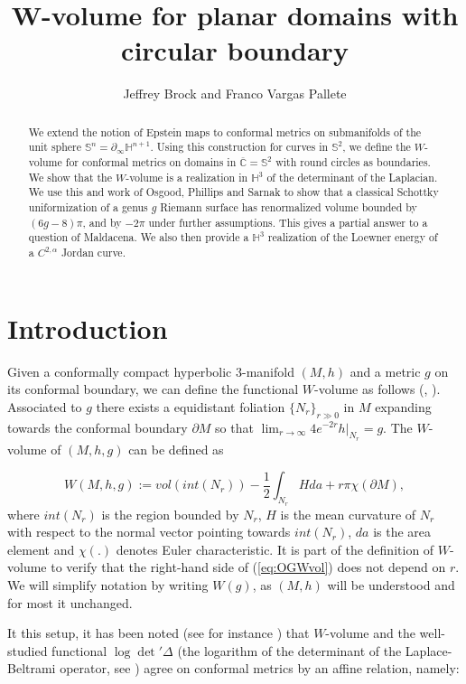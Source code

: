 \documentclass[12pt]{amsart}
\title{W-volume for planar domains with circular boundary}
\author{Jeffrey Brock and Franco Vargas Pallete}
\begin{document}
\maketitle

\begin{abstract}
    We extend the notion of Epstein maps to conformal metrics on submanifolds of the unit sphere $\mathbb{S}^n=\partial_\infty\mathbb{H}^{n+1}$. Using this construction for curves in $\mathbb{S}^2$, we define the $W$-volume for conformal metrics on domains in $\overline{\mathbb{C}}=\mathbb{S}^2$ with round circles as boundaries. We show that the $W$-volume is a realization in $\mathbb{H}^3$ of the determinant of the Laplacian. We use this and work of Osgood, Phillips and Sarnak to show that a classical Schottky uniformization of a genus $g$ Riemann surface has renormalized volume bounded by $(6g-8)\pi$, and by $-2\pi$ under further assumptions. This gives a partial answer to a question of Maldacena. We also then provide a $\mathbb{H}^3$ realization of the Loewner energy of a $C^{2,\alpha}$ Jordan curve.
\end{abstract}

\section{Introduction}

Given a conformally compact hyperbolic $3$-manifold $(M,h)$ and a metric $g$ on its conformal boundary, we can define the functional $W$-volume as follows (\cite{Graham}, \cite{KrasnovSchlenker08}). Associated to $g$ there exists a equidistant foliation $\lbrace N_r\rbrace_{r\gg0}$ in $M$ expanding towards the conformal boundary $\partial M$ so that $\lim_{r\rightarrow\infty} 4e^{-2r}h|_{N_r}=g$. The $W$-volume of $(M,h,g)$ can be defined as

\begin{equation}\label{eq:OGWvol}
    W(M,h,g) := vol(int(N_r)) - \frac12 \int_{N_r}Hda + r\pi\chi(\partial M),
\end{equation}
where $int(N_r)$ is the region bounded by $N_r$, $H$ is the mean curvature of $N_r$ with respect to the normal vector pointing towards $int(N_r)$, $da$ is the area element and $\chi(.)$ denotes Euler characteristic. It is part of the definition of $W$-volume to verify that the right-hand side of (\ref{eq:OGWvol}) does not depend on $r$. We will simplify notation by writing $W(g)$, as $(M,h)$ will be understood and for most it unchanged.

It this setup, it has been noted (see for instance \cite[Proposition 3.11]{GuillarmouMoroianuSchlenker}) that $W$-volume and the well-studied functional $\log\det'\Delta$ (the logarithm of the determinant of the Laplace-Beltrami operator, see \cite{OsgoodPhillipsSarnak}) agree on conformal metrics by an affine relation, namely:
\end{document}
